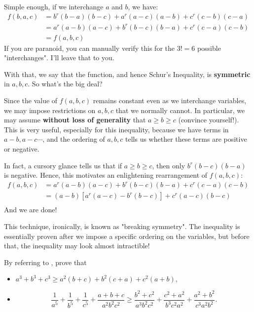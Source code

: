 \documentclass[../jarvis.tex]{subfiles}
\begin{document}
Simple enough, if we interchange $a$ and $b$, we have:
\begin{align*}
    f(b,a,c)&=b^r(b-a)(b-c)+a^r(a-c)(a-b)+c^r(c-b)(c-a) \\
    &=a^r(a-b)(a-c)+b^r(b-c)(b-a)+c^r(c-a)(c-b) \\
    &=f(a,b,c)
\end{align*}
If you are paranoid, you can manually verify this for the $3!=6$ possible "interchanges". I'll leave that to you.

With that, we say that the function, and hence Schur's Inequality, is \textbf{symmetric} in $a,b,c$. So what's the big deal?

Since the value of $f(a,b,c)$ remains constant even as we interchange variables, we may impose restrictions on $a,b,c$ that we normally cannot. In particular, we may assume \textbf{without loss of generality} that $a\geq b\geq c$ (convince yourself!). This is very useful, especially for this inequality, because we have terms in $a-b, a-c \cdots$, and the ordering of $a,b,c$ tells us whether these terms are positive or negative.

In fact, a cursory glance tells us that if $a\geq b \geq c$, then only $b^r(b-c)(b-a)$ is negative. Hence, this motivates an enlightening rearrangement of $f(a,b,c)$:
\begin{align*}
    f(a,b,c)&= a^r(a-b)(a-c)+b^r(b-c)(b-a)+c^r(c-a)(c-b)\\
            &= (a-b)[a^r(a-c)-b^r(b-c)]+c^r(a-c)(b-c) \\
\end{align*}
And we are done!
\begin{moral}
This technique, ironically, is known as "breaking symmetry". The inequality is essentially proven after we impose a specific ordering on the variables, but before that, the inequality may look almost intractible!
\end{moral}
\problem By referring to , prove that
\begin{itemize}
    \item $a^3+b^3+c^3\geq a^2(b+c)+b^2(c+a)+c^2(a+b),$
    \item \[\frac{1}{a^5}+\frac{1}{b^5}+\frac{1}{c^5}+\frac{a+b+c}{a^2b^2c^2}\geq \frac{b^2+c^2}{a^3b^2c^2}+\frac{c^2+a^2}{b^3c^2a^2}+\frac{a^2+b^2}{c^3a^2b^2}.\]
\end{itemize}
\end{document}
